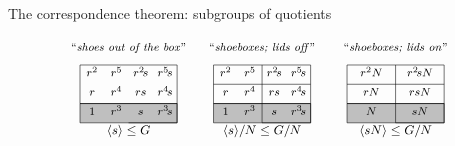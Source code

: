 \documentclass[8pt]{beamer}
\begin{document}
\begin{frame}{The correspondence theorem: subgroups of quotients}
  \medskip

  \[
  \begin{tikzpicture}[scale=.61]
    \tikzstyle{every node}=[font=\footnotesize,anchor=south]
    \begin{scope}[shift={(11,0)}]
      \node at (2,2.7) {``\emph{shoeboxes; lids on}''};
      \draw[thin,fill=faded] (0,0) rectangle (4,.8);
      \draw[thin] (0,2.4) to (4,2.4); 
      \draw[thin] (0,1.6) to (4,1.6);
      \draw[thin] (0,.8) to (4,.8);
      \draw[thin] (2,0) to (4,0);
      \draw[thin] (4,0) to (4,2.4);
      \draw[thin] (0,.8) to (0,2.4);
      \draw[thin] (2,0) to (2,2.4);
      \node at (1,.13) {$N$};
      \node at (3,.13) {$sN$};
      \node at (1,.93) {$rN$};
      \node at (3,.93) {$rsN$};
      \node at (1,1.73) {$r^2N$};
      \node at (3,1.73) {$r^2\!sN$};
      \node at (2,-.8) {\small $\<sN\>\leq G/N$};
    \end{scope}
    \begin{scope}[shift={(5.5,0)}]
      \node at (2,2.7) {``\emph{shoeboxes; lids off}''};
      \draw[thin,fill=faded] (0,0) rectangle (4,.8);
      \draw[thin] (0,2.4) to (4,2.4); 
      \draw[thin] (0,1.6) to (4,1.6);
      \draw[thin] (0,.8) to (4,.8);
      \draw[thin] (2,0) to (4,0);
      \draw[thin] (4,0) to (4,2.4);
      \draw[thin] (0,.8) to (0,2.4);
      \node at (.5,.13) {$1$};
      \node at (1.5,.13) {$r^3$};
      \node at (2.5,.13) {$s$};
      \node at (3.5,.13) {$r^3\!s$};
      \node at (.5,.93) {$r$};
      \node at (1.5,.93) {$r^4$};
      \node at (2.5,.93) {$rs$};
      \node at (3.5,.93) {$r^4\!s$};
      \node at (.5,1.73) {$r^2$};
      \node at (1.5,1.73) {$r^5$};
      \node at (2.5,1.73) {$r^2\!s$};
      \node at (3.5,1.73) {$r^5\!s$};
      \node at (2,-.8) {\small $\<s\>/N\leq G/N$};
      \draw[thin] (2,0) to (2,2.4);
    \end{scope}
    \begin{scope}[shift={(0,0)}]
      \node at (2,2.7) {``\emph{shoes out of the box}''};
      \draw[thin,fill=faded] (0,0) rectangle (4,.8);
      \draw[thin] (0,2.4) to (4,2.4); 
      \draw[thin] (0,.8) to (4,.8);
      \draw[thin] (2,0) to (4,0);
      \draw[thin] (4,0) to (4,2.4);
      \draw[thin] (0,.8) to (0,2.4);
      \node at (.5,.13) {$1$};
      \node at (1.5,.13) {$r^3$};
      \node at (2.5,.13) {$s$};
      \node at (3.5,.13) {$r^3\!s$};
      \node at (.5,.93) {$r$};
      \node at (1.5,.93) {$r^4$};
      \node at (2.5,.93) {$rs$};
      \node at (3.5,.93) {$r^4\!s$};
      \node at (.5,1.73) {$r^2$};
      \node at (1.5,1.73) {$r^5$};
      \node at (2.5,1.73) {$r^2\!s$};
      \node at (3.5,1.73) {$r^5\!s$};
      \node at (2,-.8) {\small $\<s\>\leq G$};
    \end{scope}
  \end{tikzpicture}
  \]

  \end{frame}
\end{document}
